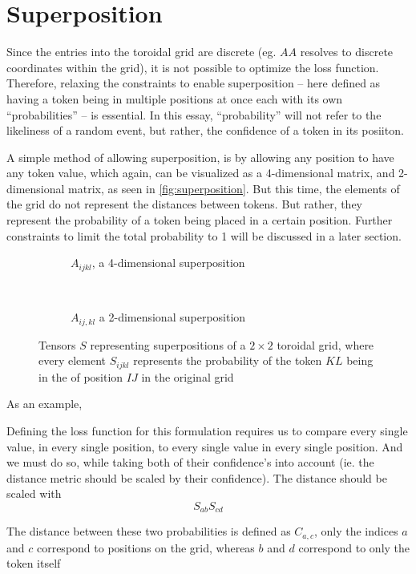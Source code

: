 
\section{Superposition}%
\label{sec:superposition}
Since the entries into the toroidal grid are discrete (eg. $AA$ resolves to discrete coordinates within the grid), it is not possible to optimize the loss function. Therefore, relaxing the constraints to enable superposition -- here defined as having a token being in multiple positions at once each with its own ``probabilities'' -- is essential. In this essay, ``probability'' will not refer to the likeliness of a random event, but rather, the confidence of a token in its posiiton.

A simple method of allowing superposition, is by allowing any position to have any token value, which again, can be visualized as a 4-dimensional matrix, and 2-dimensional matrix, as seen in \autoref{fig:superposition}. But this time, the elements of the grid do not represent the distances between tokens. But rather, they represent the probability of a token being placed in a certain position. Further constraints to limit the total probability to 1 will be discussed in a later section.
\begin{figure}[htpb]
    \centering
    \begin{subfigure}[t]{0.5\textwidth}
    \begin{center}
    \end{center}
    \caption{$A_{ijkl}$, a 4-dimensional superposition}
    \end{subfigure}%
    ~
    \begin{subfigure}[t]{0.5\textwidth}
    \begin{center}
    \end{center}
    \caption{$A_{ij,kl}$ a 2-dimensional superposition}
    \end{subfigure}

    \caption{Tensors $S$ representing superpositions of a $2\times 2$ toroidal grid, where every element $S_{ijkl}$ represents the probability of the token $KL$ being in the of position $IJ$ in the original grid}%
    \label{fig:superposition}
\end{figure}

As an example,

Defining the loss function for this formulation requires us to compare every single value, in every single position, to every single value in every single position. And we must do so, while taking both of their confidence's into account (ie. the distance metric should be scaled by their confidence). The distance should be scaled with
\begin{equation}
    S_{ab}S_{cd}
\end{equation}

The distance between these two probabilities is defined as
$C_{a,c}$, only the indices $a$ and $c$ correspond to positions on the grid, whereas $b$ and $d$ correspond to only the token itself
